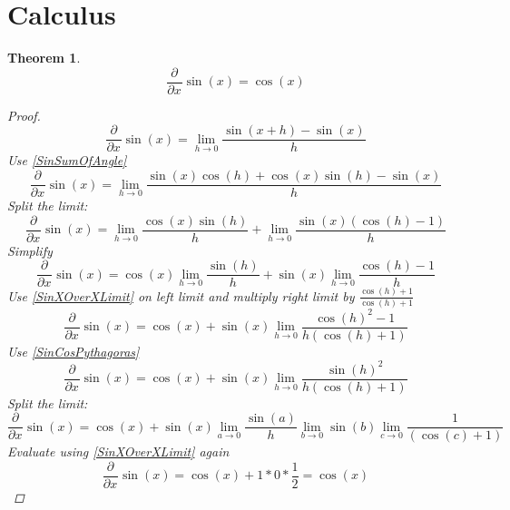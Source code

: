 \documentclass[]{article}
\newcommand{\pqty}[1]{{\left(#1\right)}}
\newcommand{\pdiff}[2]{\frac{\partial^{#2}}{\partial #1^{#2}}}
\newtheorem{theorem}{Theorem}[section]
\numberwithin{equation}{section}
\begin{document}
	\section{Calculus}
	\begin{theorem}
	\begin{equation}
	\pdiff{x}{}\sin\pqty{x}=\cos\pqty{x}
	\end{equation}
	\begin{proof}
		\begin{equation}
			\pdiff{x}{}\sin\pqty{x}=
			\lim\limits_{h\to 0}\frac{\sin\pqty{x+h}-\sin\pqty{x}}{h}
		\end{equation}
		Use \eqref{SinSumOfAngle}
		\begin{equation}
		\pdiff{x}{}\sin\pqty{x}=
		\lim\limits_{h\to 0}\frac{\sin\pqty{x}\cos\pqty{h}+\cos\pqty{x}\sin\pqty{h}-\sin\pqty{x}}{h}
		\end{equation}
		Split the limit:
		\begin{equation}
		\pdiff{x}{}\sin\pqty{x}=
		\lim\limits_{h\to 0}\frac{\cos\pqty{x}\sin\pqty{h}}{h}
		+
		\lim\limits_{h\to 0}\frac{\sin\pqty{x}\pqty{\cos\pqty{h}-1}}{h}
		\end{equation}
		Simplify
		\begin{equation}
		\pdiff{x}{}\sin\pqty{x}=
		\cos\pqty{x}\lim\limits_{h\to 0}\frac{\sin\pqty{h}}{h}
		+
		\sin\pqty{x}\lim\limits_{h\to 0}\frac{{\cos\pqty{h}-1}}{h}
		\end{equation}
		Use \eqref{SinXOverXLimit} on left limit and multiply right limit by \(\frac{\cos\pqty{h}+1}{\cos\pqty{h}+1}\)
		\begin{equation}
		\pdiff{x}{}\sin\pqty{x}=
		\cos\pqty{x}
		+
		\sin\pqty{x}\lim\limits_{h\to 0}\frac{{\cos\pqty{h}^2-1}}{h\pqty{\cos\pqty{h}+1}}
		\end{equation}
		Use \eqref{SinCosPythagoras}
		\begin{equation}
		\pdiff{x}{}\sin\pqty{x}=
		\cos\pqty{x}
		+
		\sin\pqty{x}\lim\limits_{h\to 0}\frac{{\sin\pqty{h}^2}}{h\pqty{\cos\pqty{h}+1}}
		\end{equation}
		Split the limit:
		\begin{equation}
		\pdiff{x}{}\sin\pqty{x}=
		\cos\pqty{x}
		+
		\sin\pqty{x}\lim\limits_{a\to 0}\frac{{\sin\pqty{a}}}{h}
		\lim\limits_{b\to 0}{{\sin\pqty{b}}}
		\lim\limits_{c\to 0}\frac{1}{\pqty{\cos\pqty{c}+1}}
		\end{equation}
		Evaluate using \eqref{SinXOverXLimit} again
		\begin{equation}
		\pdiff{x}{}\sin\pqty{x}=
		\cos\pqty{x}
		+
		1
		*0
		*\frac{1}{2}=
		\cos\pqty{x}
		\end{equation}
	\end{proof}
	\end{theorem}
	
\end{document}
